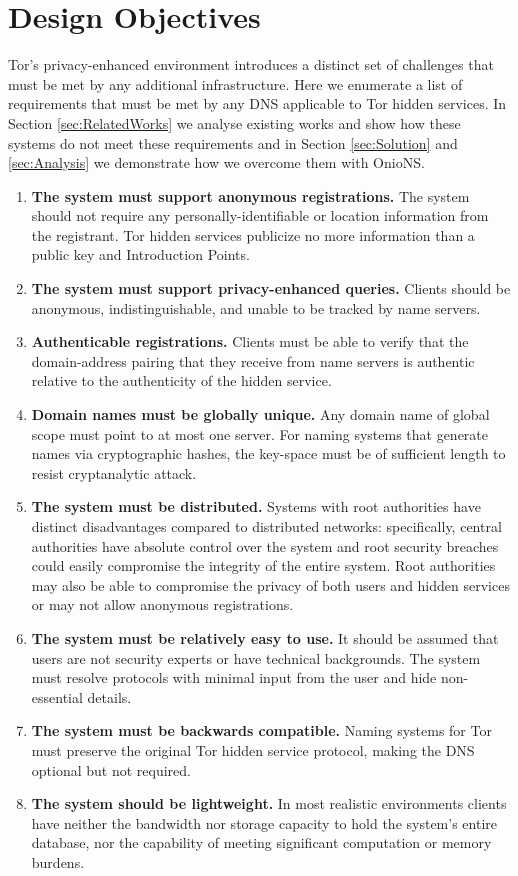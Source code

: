 \documentclass{sig-alternate}
\begin{document}
\section{Design Objectives}

Tor's privacy-enhanced environment introduces a distinct set of challenges that must be met by any additional infrastructure. Here we enumerate a list of requirements that must be met by any DNS applicable to Tor hidden services. In Section \ref{sec:RelatedWorks} we analyse existing works and show how these systems do not meet these requirements and in Section \ref{sec:Solution} and \ref{sec:Analysis} we demonstrate how we overcome them with OnioNS.

\begin{enumerate}
	\item \textbf{The system must support anonymous registrations.} The system should not require any personally-identifiable or location information from the registrant. Tor hidden services publicize no more information than a public key and Introduction Points.
	\item \textbf{The system must support privacy-enhanced queries.} Clients should be anonymous, indistinguishable, and unable to be tracked by name servers.
	\item \textbf{Authenticable registrations.} Clients must be able to verify that the domain-address pairing that they receive from name servers is authentic relative to the authenticity of the hidden service.
	\item \textbf{Domain names must be globally unique.} Any domain name of global scope must point to at most one server. For naming systems that generate names via cryptographic hashes, the key-space must be of sufficient length to resist cryptanalytic attack.
	\item \textbf{The system must be distributed.} Systems with root authorities have distinct disadvantages compared to distributed networks: specifically, central authorities have absolute control over the system and root security breaches could easily compromise the integrity of the entire system. Root authorities may also be able to compromise the privacy of both users and hidden services or may not allow anonymous registrations.
	\item \textbf{The system must be relatively easy to use.} It should be assumed that users are not security experts or have technical backgrounds. The system must resolve protocols with minimal input from the user and hide non-essential details.
	\item \textbf{The system must be backwards compatible.} Naming systems for Tor must preserve the original Tor hidden service protocol, making the DNS optional but not required.
	\item \textbf{The system should be lightweight.} In most realistic environments clients have neither the bandwidth nor storage capacity to hold the system's entire database, nor the capability of meeting significant computation or memory burdens.
\end{enumerate}
\end{document}
